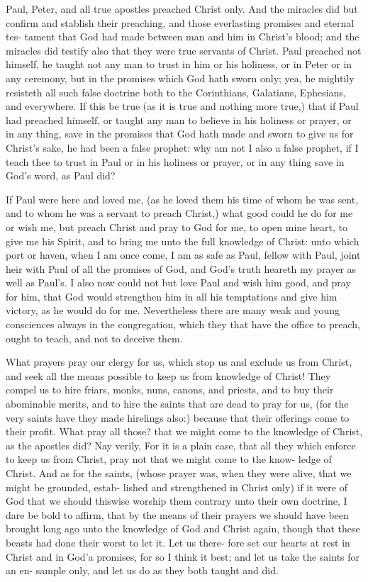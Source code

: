 \documentclass{custom}
\begin{document}
Paul, Peter, and all true apostles preached Christ only.
And the miracles did but confirm and stablish their
preaching, and those everlasting promises and eternal tes-
tament that God had made between man and him in
Christ's blood; and the miracles did testify also that they 
were true servants of Christ. Paul preached not himself,
he taught not any man to trust in him or his holiness, or in
Peter or in any ceremony, but in the promises which God 
hath sworn only; yea, he mightily resisteth all such false
doctrine both to the Corinthians, Galatians, Ephesians,
and everywhere. If this be true (as it is true and nothing 
more true,) that if Paul had preached himself, or taught 
any man to believe in his holiness or prayer, or in any thing,
save in the promises that God hath made and sworn to
give us for Christ's sake, he had been a false prophet:
why am not I also a false prophet, if I teach thee to trust 
in Paul or in his holiness or prayer, or in any thing save 
in God's word, as Paul did? 

If Paul were here and loved me, (as he loved them 
his time of whom he was sent, and to whom he was a servant 
to preach Christ,) what good could he do for me or wish 
me, but preach Christ and pray to God for me, to open 
mine heart, to give me his Spirit, and to bring me unto the 
full knowledge of Christ: unto which port or haven, when 
I am once come, I am as safe as Paul, fellow with Paul, 
joint heir with Paul of all the promises of God, and God's 
truth heareth my prayer as well as Paul's. I also now could 
not but love Paul and wish him good, and pray for him, 
that God would strengthen him in all his temptations and 
give him victory, as he would do for me. Nevertheless 
there are many weak and young consciences always in 
the congregation, which they that have the office to preach, 
ought to teach, and not to deceive them. 

What prayers pray our clergy for us, which stop us and 
exclude us from Christ, and seek all the means possible to 
keep us from knowledge of Christ! They compel us to 
hire friars, monks, nuns, canons, and priests, and to 
buy their abominable merits, and to hire the saints that 
are dead to pray for us, (for the very saints have they made 
hirelings also:) because that their offerings come to their 
profit. What pray all those? that we might come to the 
knowledge of Christ, as the apostles did? Nay verily, For 
it is a plain case, that all they which enforce to keep us 
from Christ, pray not that we might come to the know- 
ledge of Christ. And as for the saints, (whose prayer was, 
when they were alive, that we might be grounded, estab- 
lished and strengthened in Christ only) if it were of God 
that we should thiswise worship them contrary unto their 
own doctrine, I dare be bold to affirm, that by the means 
of their prayers we should have been brought long ago 
unto the knowledge of God and Christ again, though that 
these beasts had done their worst to let it. Let us there- 
fore set our hearts at rest in Christ and in God'a promises, 
for so I think it best; and let us take the saints for an en- 
sample only, and let us do as they both taught and did. 
\end{document}
